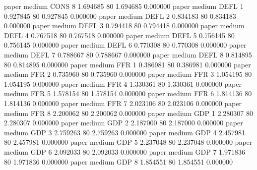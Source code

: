               paper     medium     CONS                 8  1.694685 80       1.694685           0.000000
              paper     medium     DEFL                 1  0.927845 80       0.927845           0.000000
              paper     medium     DEFL                 2  0.834183 80       0.834183           0.000000
              paper     medium     DEFL                 3  0.794418 80       0.794418           0.000000
              paper     medium     DEFL                 4  0.767518 80       0.767518           0.000000
              paper     medium     DEFL                 5  0.756145 80       0.756145           0.000000
              paper     medium     DEFL                 6  0.770308 80       0.770308           0.000000
              paper     medium     DEFL                 7  0.788667 80       0.788667           0.000000
              paper     medium     DEFL                 8  0.814895 80       0.814895           0.000000
              paper     medium      FFR                 1  0.386981 80       0.386981           0.000000
              paper     medium      FFR                 2  0.735960 80       0.735960           0.000000
              paper     medium      FFR                 3  1.054195 80       1.054195           0.000000
              paper     medium      FFR                 4  1.330361 80       1.330361           0.000000
              paper     medium      FFR                 5  1.578154 80       1.578154           0.000000
              paper     medium      FFR                 6  1.814136 80       1.814136           0.000000
              paper     medium      FFR                 7  2.023106 80       2.023106           0.000000
              paper     medium      FFR                 8  2.200062 80       2.200062           0.000000
              paper     medium      GDP                 1  2.280307 80       2.280307           0.000000
              paper     medium      GDP                 2  2.187000 80       2.187000           0.000000
              paper     medium      GDP                 3  2.759263 80       2.759263           0.000000
              paper     medium      GDP                 4  2.457981 80       2.457981           0.000000
              paper     medium      GDP                 5  2.237048 80       2.237048           0.000000
              paper     medium      GDP                 6  2.092033 80       2.092033           0.000000
              paper     medium      GDP                 7  1.971836 80       1.971836           0.000000
              paper     medium      GDP                 8  1.854551 80       1.854551           0.000000
